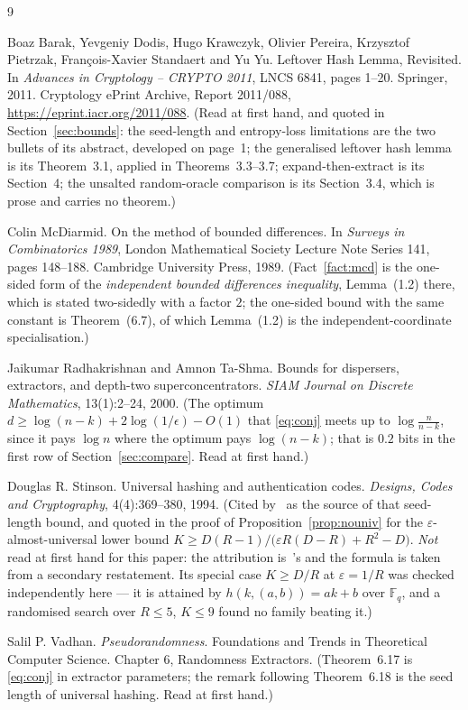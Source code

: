 \documentclass{aicr-solution}
\begin{document}
\begin{aicrbibliography}{9}

Boaz Barak, Yevgeniy Dodis, Hugo Krawczyk, Olivier Pereira, Krzysztof Pietrzak,
Fran\c{c}ois-Xavier Standaert and Yu Yu.
\newblock Leftover Hash Lemma, Revisited.
\newblock In \emph{Advances in Cryptology -- CRYPTO 2011}, LNCS 6841, pages 1--20. Springer, 2011.
\newblock Cryptology ePrint Archive, Report 2011/088, \url{https://eprint.iacr.org/2011/088}.
\newblock (Read at first hand, and quoted in Section~\ref{sec:bounds}: the seed-length and
entropy-loss limitations are the two bullets of its abstract, developed on page~1; the generalised
leftover hash lemma is its Theorem~3.1, applied in Theorems~3.3--3.7; expand-then-extract is its
Section~4; the unsalted random-oracle comparison is its Section~3.4, which is prose and carries no
theorem.)

Colin McDiarmid.
\newblock On the method of bounded differences.
\newblock In \emph{Surveys in Combinatorics 1989}, London Mathematical Society Lecture Note
Series 141, pages 148--188. Cambridge University Press, 1989.
\newblock (Fact~\ref{fact:mcd} is the one-sided form of the \emph{independent bounded differences
inequality}, Lemma~(1.2) there, which is stated two-sidedly with a factor $2$; the one-sided bound
with the same constant is Theorem~(6.7), of which Lemma~(1.2) is the independent-coordinate
specialisation.)

Jaikumar Radhakrishnan and Amnon Ta-Shma.
\newblock Bounds for dispersers, extractors, and depth-two superconcentrators.
\newblock \emph{SIAM Journal on Discrete Mathematics}, 13(1):2--24, 2000.
\newblock (The optimum $d \ge \log(n-k) + 2\log(1/\epsilon) - O(1)$ that \eqref{eq:conj} meets up
to $\log\frac{n}{n-k}$, since it pays $\log n$ where the optimum pays $\log(n-k)$; that is $0.2$
bits in the first row of Section~\ref{sec:compare}.
Read at first hand.)

Douglas R. Stinson.
\newblock Universal hashing and authentication codes.
\newblock \emph{Designs, Codes and Cryptography}, 4(4):369--380, 1994.
\newblock (Cited by~\cite{BDKPPSY11} as the source of that seed-length bound, and quoted in the
proof of Proposition~\ref{prop:nouniv} for the $\varepsilon$-almost-universal lower bound
$K \ge D(R-1)/\bigl(\varepsilon R(D-R) + R^{2} - D\bigr)$. \emph{Not} read at first hand for this
paper: the attribution is~\cite{BDKPPSY11}'s and the formula is taken from a secondary restatement.
Its special case $K \ge D/R$ at $\varepsilon = 1/R$ was checked independently here --- it is
attained by $h(k,(a,b)) = ak+b$ over $\mathbb{F}_q$, and a randomised search over $R \le 5$,
$K \le 9$ found no family beating it.)

Salil P. Vadhan.
\newblock \emph{Pseudorandomness}.
\newblock Foundations and Trends in Theoretical Computer Science. Chapter 6, Randomness Extractors.
\newblock (Theorem~6.17 is \eqref{eq:conj} in extractor parameters; the remark following
Theorem~6.18 is the seed length of universal hashing. Read at first hand.)

\end{aicrbibliography}
\end{document}

